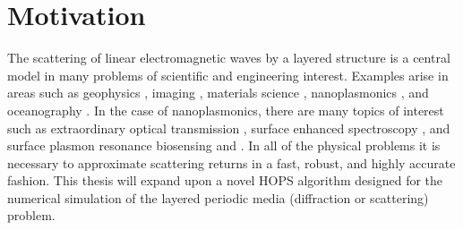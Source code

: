 \section{Motivation}
\label{intro:motivation}

The scattering of linear electromagnetic waves by a layered structure is a
central model in many problems of scientific and engineering interest. Examples arise in areas such as geophysics \cite{VirieuxOperto09,BleibRondenay09}, imaging \cite{NW01}, materials science \cite{Godreche92}, nanoplasmonics \cite{Raether88,Maier07,EnochBonod12}, and oceanography \cite{BL82}. In the case of nanoplasmonics, there are many topics of interest such as extraordinary optical transmission \cite{ELGTW98}, surface enhanced spectroscopy \cite{Moskovits85}, and surface plasmon resonance biosensing \cite{Homola08,ILWJLNNO11} and \cite{LJJOO12,JJJLWO13,RJOM13,NichollsReitichJohnsonOh14}. In all of the physical problems it is necessary to approximate scattering returns in a fast, robust, and highly accurate fashion. This thesis will expand upon a novel HOPS algorithm \cite{Nicholls14b,NichollsTammali15,NichollsOhJohnsonReitich15} designed for the numerical simulation of the layered periodic media (diffraction or scattering) problem.

